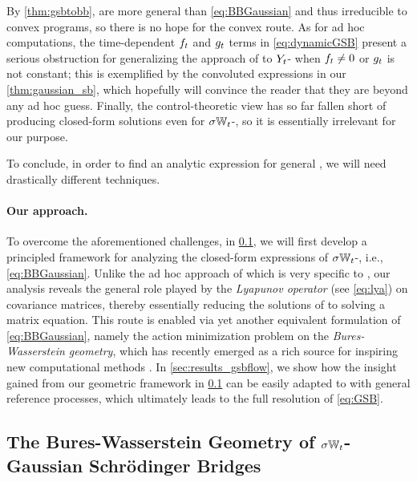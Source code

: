 By \cref{thm:gsbtobb},  are more general than \eqref{eq:BBGaussian} and thus irreducible to convex programs, so there is no hope for the convex route. As for ad hoc computations, the time-dependent $\driftf$ and $\volat[\ctime]$ terms in \eqref{eq:dynamicGSB} present a serious obstruction for generalizing the approach of \citet{mallasto2021entropy} to $\refsde$- when $\driftf \neq 0$ or $\volat[\ctime]$ is not constant; this is exemplified by the convoluted expressions in our \cref{thm:gaussian_sb}, which hopefully will convince the reader that they are beyond any ad hoc guess. Finally, the control-theoretic view has so far fallen short of producing closed-form solutions even for $\sigma\Wiener$-, so it is essentially irrelevant for our purpose. 

To conclude, in order to find an analytic expression for general , we will need drastically different techniques.





\paragraph{Our approach.}

To overcome the aforementioned challenges, in \cref{sec:mechanics_gsbflow}, we will first develop a principled framework for analyzing the closed-form expressions of $\sigma\Wiener$-, i.e., \eqref{eq:BBGaussian}. Unlike the ad hoc approach of \citet{mallasto2021entropy} which is very specific to , our analysis reveals the general role played by the \emph{Lyapunov operator} (see \eqref{eq:lya}) on covariance matrices, thereby essentially reducing the solutions of  to solving a matrix equation. This route is enabled via yet another equivalent formulation of \eqref{eq:BBGaussian}, namely the action minimization problem on the \emph{Bures-Wasserstein geometry}, which has recently emerged as a rich source for inspiring new computational methods \citep{chewi2020gradient, altschuler2021averaging, han2021riemannian}. In \cref{sec:results_gsbflow}, we show how the insight gained from our geometric framework in \cref{sec:mechanics_gsbflow} can be easily adapted to  with general reference processes, which ultimately leads to the full resolution of \eqref{eq:GSB}.


\subsection{The Bures-Wasserstein Geometry of $\sigma\Wiener$-Gaussian Schr\"odinger Bridges}
\label{sec:mechanics_gsbflow}


